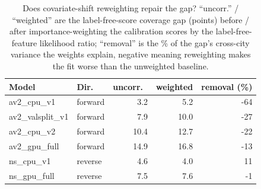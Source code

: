 \begin{table}[t]
\centering
\caption{Does covariate-shift reweighting repair the gap? ``uncorr.'' / ``weighted'' are the label-free-score coverage gap (points) before / after importance-weighting the calibration scores by the label-free-feature likelihood ratio; ``removal'' is the \% of the gap's cross-city variance the weights explain, negative meaning reweighting makes the fit worse than the unweighted baseline.}
\label{tab:reweight}
\begin{tabular}{llrrr}
\toprule
Model & Dir. & uncorr.\ & weighted & removal (\%) \\
\midrule
av2\_cpu\_v1 & forward & 3.2 & 5.2 & -64 \\
av2\_valsplit\_v1 & forward & 7.9 & 10.0 & -27 \\
av2\_cpu\_v2 & forward & 10.4 & 12.7 & -22 \\
av2\_gpu\_full & forward & 14.9 & 16.8 & -13 \\
ns\_cpu\_v1 & reverse & 4.6 & 4.0 & 11 \\
ns\_gpu\_full & reverse & 7.5 & 7.6 & -1 \\
\bottomrule
\end{tabular}
\end{table}

